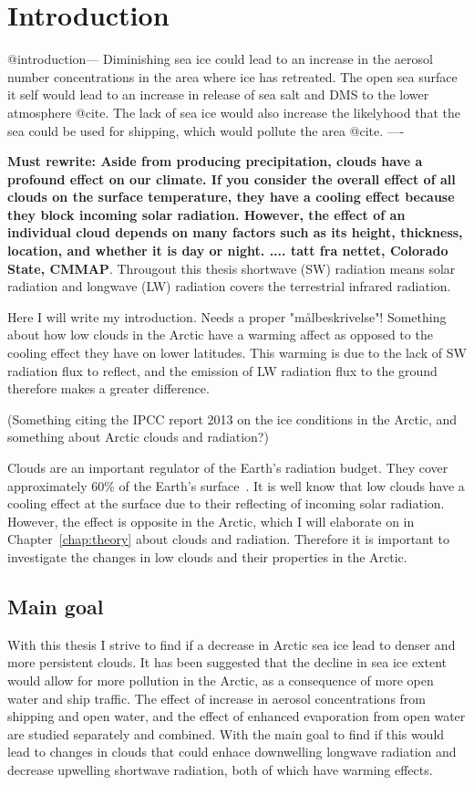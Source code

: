\chapter{Introduction}
\label{chap:introduction}


@introduction--- %
Diminishing sea ice could lead to an increase in the aerosol number concentrations in the area where ice has retreated. The open sea surface it self would lead to an increase in release of sea salt and DMS to the lower atmosphere @cite. The lack of sea ice would also increase the likelyhood that the sea could be used for shipping, which would pollute the area @cite.
----


\textbf{Must rewrite: Aside from producing precipitation, clouds have a profound effect on our climate. If you consider the overall effect of all clouds on the surface temperature, they have a cooling effect because they block incoming solar radiation. However, the effect of an individual cloud depends on many factors such as its height, thickness, location, and whether it is day or night. .... tatt fra nettet, Colorado State, CMMAP}. Througout this thesis shortwave (SW) radiation means solar radiation and longwave (LW) radiation covers the terrestrial infrared radiation.

Here I will write my introduction. Needs a proper "målbeskrivelse"!
Something about how low clouds in the Arctic have a warming affect as opposed to the cooling effect they have on lower latitudes. This warming is due to the lack of SW radiation flux to reflect, and the emission of LW radiation flux to the ground therefore makes a greater difference.

(Something citing the IPCC report 2013 on the ice conditions in the Arctic, and something about Arctic clouds and radiation?)

Clouds are an important regulator of the Earth's radiation budget. They cover approximately 60\% of the Earth's surface~\citep{Lohmann2005}. It is well know that low clouds have a cooling effect at the surface due to their reflecting of incoming solar radiation. However, the effect is opposite in the Arctic, which I will elaborate on in Chapter~\ref{chap:theory} about clouds and radiation. Therefore it is important to investigate the changes in low clouds and their properties in the Arctic.

\section{Main goal}
With this thesis I strive to find if a decrease in Arctic sea ice lead to denser and more persistent clouds. It has been suggested that the decline in sea ice extent would allow for more pollution in the Arctic, as a consequence of more open water and ship traffic. The effect of increase in aerosol concentrations from shipping and open water, and the effect of enhanced evaporation from open water are studied separately and combined. With the main goal to find if this would lead to changes in clouds that could enhace downwelling longwave radiation and decrease upwelling shortwave radiation, both of which have warming effects.

